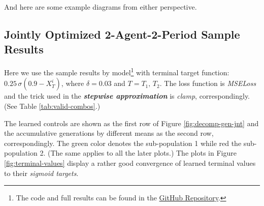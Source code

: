 \documentclass[a4paper,10pt]{article}
\newcommand{\1}{\mathbf{1}}
\begin{document}
And here are some example diagrams from either perspective.

\newpage  %


\subsection{Jointly Optimized 2-Agent-2-Period Sample Results}

Here we use the sample results by model\footnote{The code and full results can be found in the \href{https://github.com/OrangeAoo/PA-MFG-FBSDE/blob/FBSDE/2Period/Joint_Optim_2Prdx1/Adamax_clamp_sig_MSE.ipynb}{GitHub Repository}.} with terminal target function: $0.25\,\sigma{\left(0.9-X_T^i\right)}$, where $\delta=0.03$ and $T=T_1,\,T_2$. The loss function is \textit{MSELoss} and the trick used in the \textbf{\textit{stepwise approximation}} is \textit{clamp}, correspondingly. (See Table \ref{tab:valid-combos}.)

The learned controls are shown as the first row of Figure \ref{fig:decomp-gen-jnt} and the accumulative generations by different means as the second row, correspondingly. The green color denotes the sub-population 1 while red the sub-population 2. (The same applies to all the later plots.) 
The plots in Figure \ref{fig:terminal-values} display a rather good convergence of learned terminal values to their \textit{sigmoid targets}. 
\end{document}
